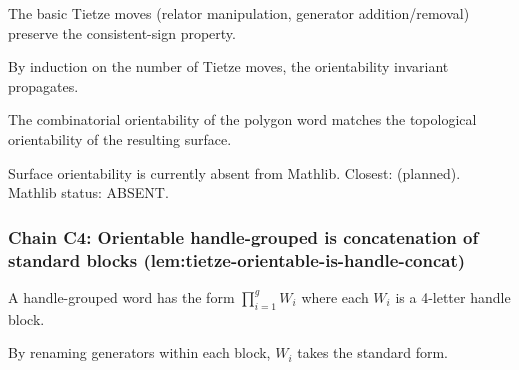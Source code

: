\begin{lemma}
\label{lem:tmo-r2}
The basic Tietze moves (relator manipulation, generator addition/removal) preserve the consistent-sign property.
\leanok
\end{lemma}

\begin{lemma}
\label{lem:tmo-r3}
By induction on the number of Tietze moves, the orientability invariant propagates.
\leanok
\end{lemma}

\begin{lemma}
\label{lem:tmo-r4}
The combinatorial orientability of the polygon word matches the topological orientability of the resulting surface.
\leanok
\end{lemma}

\begin{lemma}
\label{lem:tmo-r5}
Surface orientability is currently absent from Mathlib.  Closest:  (planned).  Mathlib status: ABSENT.
\leanok
\end{lemma}

\subsubsection*{Chain C4: Orientable handle-grouped is concatenation of standard blocks (lem:tietze-orientable-is-handle-concat)}

\begin{lemma}
\label{lem:toh-r1}
A handle-grouped word has the form $\prod_{i=1}^{g} W_{i}$ where each $W_{i}$ is a 4-letter handle block.
\leanok
\end{lemma}

\begin{lemma}
\label{lem:toh-r2}
By renaming generators within each block, $W_{i}$ takes the standard form.
\leanok
\end{lemma}

